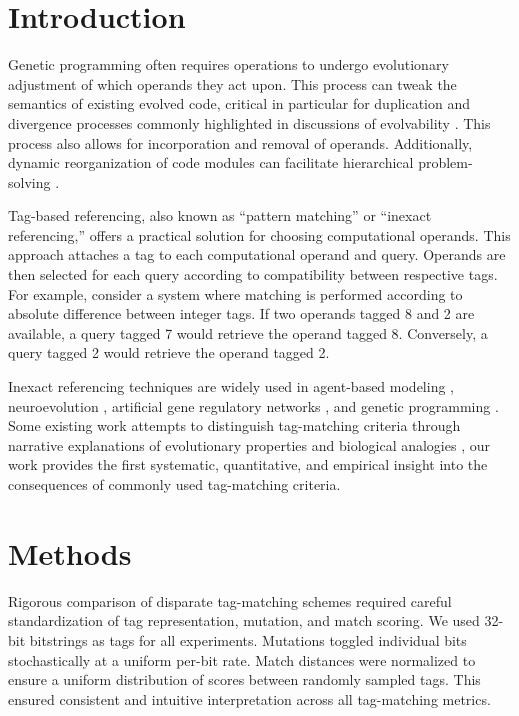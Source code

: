 \section{Introduction} \label{sec:introduction}

Genetic programming often requires operations to undergo evolutionary adjustment of which operands they act upon.
This process can tweak the semantics of existing evolved code, critical in particular for duplication and divergence processes commonly highlighted in discussions of evolvability \citep{altenberg1994evolution}.
This process also allows for incorporation and removal of operands.
Additionally, dynamic reorganization of code modules can facilitate hierarchical problem-solving \citep{Kinnear:Koza:1994:adf}.

Tag-based referencing, also known as ``pattern matching'' or ``inexact referencing,'' offers a practical solution for choosing computational operands.
This approach attaches a tag to each computational operand and query.
Operands are then selected for each query according to compatibility between respective tags.
For example, consider a system where matching is performed according to absolute difference between integer tags.
If two operands tagged 8 and 2 are available, a query tagged 7 would retrieve the operand tagged 8.
Conversely, a query tagged 2 would retrieve the operand tagged 2.

Inexact referencing techniques are widely used in agent-based modeling \citep{riolo2001evolution}, neuroevolution \citep{reisinger2007acquiring}, artificial gene regulatory networks \citep{banzhaf2003artificial}, and genetic programming \citep{spector2011tag, lalejini2018evolving}.
Some existing work attempts to distinguish tag-matching criteria through narrative explanations of evolutionary properties and biological analogies \citep{downing2015intelligence,scherer2004activation}, our work provides the first systematic, quantitative, and empirical insight into the consequences of commonly used tag-matching criteria.

\section{Methods}

Rigorous comparison of disparate tag-matching schemes required careful standardization of tag representation, mutation, and match scoring.
We used 32-bit bitstrings as tags for all experiments.
Mutations toggled individual bits stochastically at a uniform per-bit rate.
Match distances were normalized to ensure a uniform distribution of scores between randomly sampled tags.
This ensured consistent and intuitive interpretation across all tag-matching metrics.

